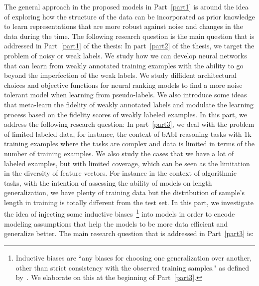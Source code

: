 The general approach in the proposed models in Part~\ref{part1} is around the idea of exploring how the structure of the data can be incorporated as prior knowledge to learn representations that are more robust against noise and changes in the data during the time. 
The following research question is the main question that is addressed in Part~\ref{part1} of the thesis:
%
In part~\ref{part2} of the thesis, we target the problem of noisy or weak labels. We study how we can develop neural networks that can learn from weakly annotated training examples with the ability to go beyond the imperfection of the weak labels. We study diffident architectural choices and objective functions for neural ranking models to find a more noise tolerant model when learning from pseudo-labels.  We also introduce some ideas that meta-learn the fidelity of weakly annotated labels and modulate the learning process based on the fidelity scores of weakly labeled examples.
In this part, we address the following research question:
%
In part~\ref{part3}, we deal with the problem of limited labeled data, for instance, the context of bAbI reasoning tasks with 1k training examples where the tasks are complex and data is limited in terms of the number of training examples. We also study the cases that we have a lot of labeled examples, but with limited coverage, which can be seen as the limitation in the diversity of feature vectors. For instance in the context of algorithmic tasks, with the intention of assessing the ability of models on length generalization, we have plenty of training data but the distribution of sample's length in training is totally different from the test set. 
In this part, we investigate the idea of injecting some inductive biases~\footnote{Inductive biases are ``any biases for choosing one generalization over another, other than strict consistency with the observed training samples." as defined by~\citet{Mitchell80theneed}. We elaborate on this at the beginning of Part~\ref{part3}.} into models in order to encode modeling assumptions that help the models to be more data efficient and generalize better.
The main research question that is addressed in Part~\ref{part3} is:

